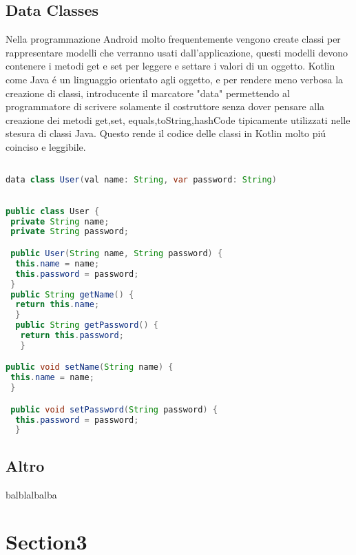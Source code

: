 \subsection{Data Classes}
Nella programmazione Android molto frequentemente vengono create classi per rappresentare modelli che verranno usati dall'applicazione, questi modelli devono contenere i metodi get e set per leggere e settare i valori di un oggetto.
Kotlin come Java \'e un linguaggio orientato agli oggetto, e per rendere meno verbosa la creazione di classi, introducente il marcatore "data" permettendo al programmatore di scrivere solamente il costruttore senza dover pensare alla creazione dei metodi get,set, equals,toString,hashCode tipicamente utilizzati nelle stesura di classi Java.
Questo rende il codice delle classi in Kotlin molto pi\'u coinciso e leggibile.

\begin{lstlisting}[language=java,caption={Esempio class Kotlin}]

data class User(val name: String, var password: String)
\end{lstlisting}

\begin{lstlisting}[language=java,caption={Esempio class Java}]

public class User {
 private String name;
 private String password;

 public User(String name, String password) {
  this.name = name;
  this.password = password;
 }
 public String getName() {
  return this.name;
  }
  public String getPassword() {
   return this.password;
   }

public void setName(String name) {
 this.name = name;
 }

 public void setPassword(String password) {
  this.password = password;
  }
    \end{lstlisting}


\subsection{Altro}
balblalbalba



\section{Section3}



\clearpage{\pagestyle{empty}\cleardoublepage}
